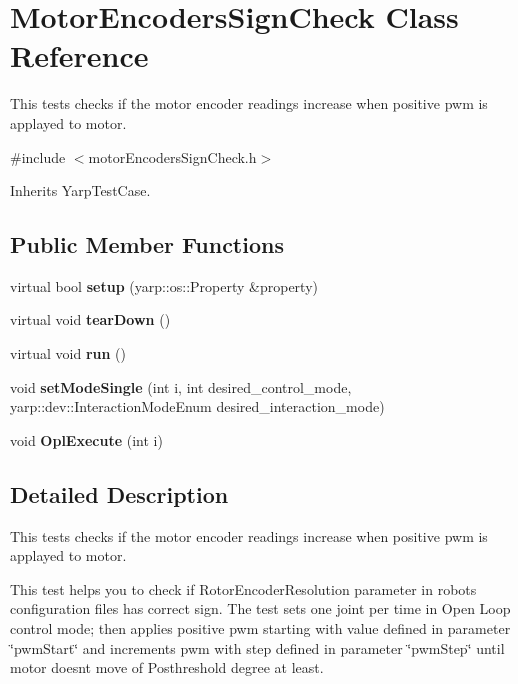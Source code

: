 \section{Motor\+Encoders\+Sign\+Check Class Reference}
\label{classMotorEncodersSignCheck}


This tests checks if the motor encoder readings increase when positive pwm is applayed to motor.  




{\ttfamily \#include $<$motor\+Encoders\+Sign\+Check.\+h$>$}



Inherits Yarp\+Test\+Case.

\subsection*{Public Member Functions}
\begin{DoxyCompactItemize}
\item 
\label{classMotorEncodersSignCheck_a9473c20f3efe4b8fc2c554b6d12f65f9} 
virtual bool {\bfseries setup} (yarp\+::os\+::\+Property \&property)
\item 
\label{classMotorEncodersSignCheck_a706ce3dbc1073c90b2981ed55286a407} 
virtual void {\bfseries tear\+Down} ()
\item 
\label{classMotorEncodersSignCheck_ac1bb7e6d1b55c9e97c2432dd78f0c625} 
virtual void {\bfseries run} ()
\item 
\label{classMotorEncodersSignCheck_adc3e407539e8368936eed1749dc69317} 
void {\bfseries set\+Mode\+Single} (int i, int desired\+\_\+control\+\_\+mode, yarp\+::dev\+::\+Interaction\+Mode\+Enum desired\+\_\+interaction\+\_\+mode)
\item 
\label{classMotorEncodersSignCheck_aeb8969c7334373e30d409de1a4efb429} 
void {\bfseries Opl\+Execute} (int i)
\end{DoxyCompactItemize}


\subsection{Detailed Description}
This tests checks if the motor encoder readings increase when positive pwm is applayed to motor. 

This test helps you to check if Rotor\+Encoder\+Resolution parameter in robot\textquotesingle{}s configuration files has correct sign. The test sets one joint per time in Open Loop control mode; then applies positive pwm starting with value defined in parameter \char`\"{}pwm\+Start\char`\"{} and increments pwm with step defined in parameter \char`\"{}pwm\+Step\char`\"{} until motor doesn\textquotesingle{}t move of Posthreshold degree at least.

